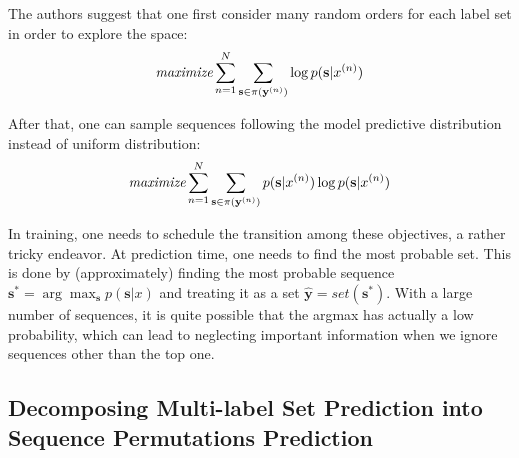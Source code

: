 The authors suggest that one first consider many random orders for each label set in order to explore the space:
\begin{align}
\textit{maximize} \sum_{n=1}^N \sum_{\mathbf{s}\in \pi(\mathbf{y}^{(n)})}\log p(\mathbf{s}|x^{(n)})
\label{eq:wrong_obj}
\end{align} 

After that, one can sample sequences following the model predictive distribution instead of uniform distribution:
\begin{align}
\textit{maximize} \sum_{n=1}^N \sum_{\mathbf{s}\in \pi(\mathbf{y}^{(n)})}p(\mathbf{s}|x^{(n)})\log p(\mathbf{s}|x^{(n)})
\label{eq:sample_obj}
\end{align} 

In training, one needs to schedule the transition among these objectives, a rather tricky endeavor. At prediction time, one needs to find the most probable set. This is done by (approximately) finding the most probable sequence $\mathbf{s}^*=\arg\max_\mathbf{s} p(\mathbf{s}|x)$ and treating it as a set $\hat{\mathbf{y}}=set(\mathbf{s}^*)$. With a large number of sequences, it is quite possible that the argmax has actually a low probability, which can lead to neglecting important information when we ignore sequences other than the top one.



\subsection{Decomposing Multi-label Set Prediction into Sequence Permutations Prediction}


